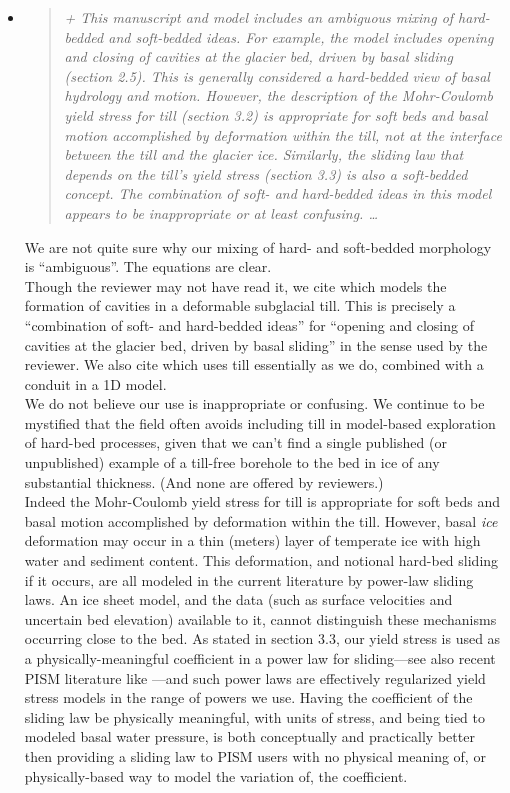 \documentclass[11pt,reqno]{amsart}
\newcommand{\reply}[2]{
\medskip\medskip
\item  \begin{quote}
\emph{#1}
\end{quote}

\medskip
\noindent #2}
\begin{document}
\begin{itemize}
\reply{+ This manuscript and model includes an ambiguous mixing of hard-bedded and soft-bedded ideas. For example, the model includes opening and closing of cavities at
the glacier bed, driven by basal sliding (section 2.5).  This is generally considered
a hard-bedded view of basal hydrology and motion.  However, the description of the
Mohr-Coulomb yield stress for till (section 3.2) is appropriate for soft beds and basal
motion accomplished by deformation \emph{within} the till, not at the interface between the
till and the glacier ice. Similarly, the sliding law that depends on the till's yield stress
(section 3.3) is also a soft-bedded concept. The combination of soft- and hard-bedded
ideas in this model appears to be inappropriate or at least confusing. \dots}
{We are not quite sure why our mixing of hard- and soft-bedded morphology is ``ambiguous''.  The equations are clear.\\
\indent Though the reviewer may not have read it, we cite \cite{Schoof2007deformable} which models the formation of cavities in a deformable subglacial till.  This is precisely a ``combination of soft- and hard-bedded ideas'' for ``opening and closing of cavities at
the glacier bed, driven by basal sliding'' in the sense used by the reviewer.  We also cite   \cite{vanderWeletal2013} which uses till essentially as we do, combined with a conduit in a 1D model. \\
\indent We do not believe our use is inappropriate or confusing.  We continue to be mystified that the field often avoids including till in model-based exploration of hard-bed processes, given that we can't find a single published (or unpublished) example of a till-free borehole to the bed in ice of any substantial thickness.  (And none are offered by reviewers.) \\
\indent Indeed the Mohr-Coulomb yield stress for till is appropriate for soft beds and basal motion accomplished by deformation within the till.  However, basal \emph{ice} deformation may occur in a thin (meters) layer of temperate ice with high water and sediment content. This deformation, and notional hard-bed sliding if it occurs, are all modeled in the current literature by power-law sliding laws.  An ice sheet model, and the data (such as surface velocities and uncertain bed elevation) available to it, cannot distinguish these mechanisms occurring close to the bed.  As stated in section 3.3, our yield stress is used as a physically-meaningful coefficient in a power law for sliding---see also recent PISM literature like \cite{AschwandenAdalgeirsdottirKhroulev}---and such power laws are effectively regularized yield stress models \cite{SchoofCoulombBlatter} in the range of powers we use.  Having the coefficient of the sliding law be physically meaningful, with units of stress, and being tied to modeled basal water pressure, is both conceptually and practically better then providing a sliding law to PISM users with no physical meaning of, or physically-based way to model the variation of, the coefficient.}


\end{itemize}
\end{document}
